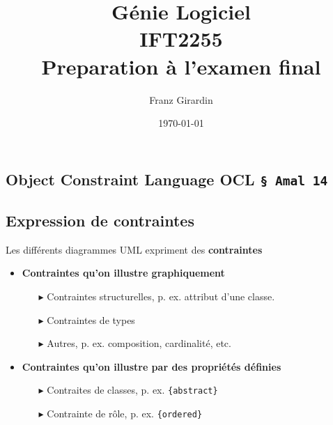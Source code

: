 \documentclass[16pt]{report}
\title{\Huge{Génie Logiciel}\\{IFT2255}\\{\textbf{Preparation à l'examen final}}}
\author{\huge{Franz Girardin}}
\date{\today}
\begin{document}
\maketitle
\pagebreak
\tableofcontents 
\pagebreak



\begin{multicols*}{2}
    \chapter{Object Constraint Language OCL \texttt{\S \; Amal 14}  }

        \section{Expression de contraintes}
        \begin{note}{}{}
            Les différents diagrammes UML expriment des \textbf{contraintes}  
        \end{note}

        \begin{itemize}
            \item \textbf{Contraintes qu'on illustre graphiquement}
                \begin{itemize}
                    \item[$\blacktriangleright$] Contraintes structurelles, p. ex. attribut d'une classe. 
                    \item[$\blacktriangleright$] Contraintes de types
                    \item[$\blacktriangleright$] Autres, p. ex. composition, cardinalité, etc. 
                    
                \end{itemize}
            \item \textbf{Contraintes qu'on illustre par des propriétés définies}
                    \begin{enumerate}
                        \item[$\blacktriangleright$] Contraites de classes, p. ex. \texttt{\{abstract\}}  
                        \item[$\blacktriangleright$] Contrainte de rôle, p. ex. \texttt{\{ordered\}}
                    \end{enumerate}

        \end{itemize}


\end{multicols*}
\end{document}
